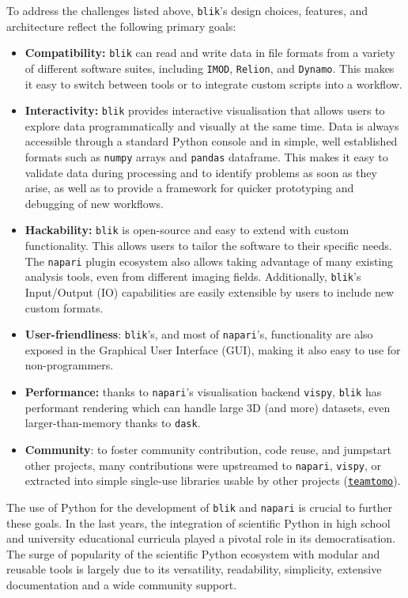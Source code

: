 To address the challenges listed above, \texttt{blik}'s design choices, features, and architecture reflect the following primary goals:

\begin{itemize}
    \item \textbf{Compatibility:} \texttt{blik} can read and write data in file formats from a variety of different software suites, including \texttt{IMOD}, \texttt{Relion}, and \texttt{Dynamo}. This makes it easy to switch between tools or to integrate custom scripts into a workflow. 
    \item \textbf{Interactivity:} \texttt{blik} provides interactive visualisation that allows users to explore data programmatically and visually at the same time. Data is always accessible through a standard Python console and in simple, well established formats such as \texttt{numpy} arrays and \texttt{pandas} dataframe. This makes it easy to validate data during processing and to identify problems as soon as they arise, as well as to provide a framework for quicker prototyping and debugging of new workflows. 
    \item \textbf{Hackability:} \texttt{blik} is open-source and easy to extend with custom functionality. This allows users to tailor the software to their specific needs. The \texttt{napari} plugin ecosystem also allows taking advantage of many existing analysis tools, even from different imaging fields. Additionally, \texttt{blik}'s Input/Output (IO) capabilities are easily extensible by users to include new custom formats. 
    \item \textbf{User-friendliness}: \texttt{blik}'s, and most of \texttt{napari}'s, functionality are also exposed in the Graphical User Interface (GUI), making it also easy to use for non-programmers. 
    \item \textbf{Performance:} thanks to \texttt{napari}'s visualisation backend \texttt{vispy}, \texttt{blik} has performant rendering which can handle large 3D (and more) datasets, even larger-than-memory thanks to \texttt{dask}. 
    \item \textbf{Community}: to foster community contribution, code reuse, and jumpstart other projects, many contributions were upstreamed to \texttt{napari}, \texttt{vispy}, or extracted into simple single-use libraries usable by other projects (\href{https://github.com/teamtomo/}{\texttt{teamtomo}}).
\end{itemize}

The use of Python for the development of \texttt{blik} and \texttt{napari} is crucial to further these goals. In the last years, the integration of scientific Python in high school and university educational curricula played a pivotal role in its democratisation. The surge of popularity of the scientific Python ecosystem with modular and reusable tools is largely due to its versatility, readability, simplicity, extensive documentation and a wide community support.

